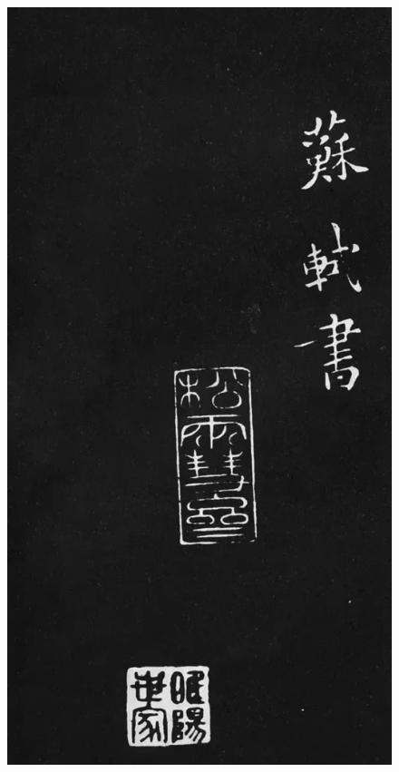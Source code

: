 \documentclass[a4paper,twoside]{article}
\begin{document}
\begin{figure}[ht]
\centering
\includegraphics[width=12.2cm]{images/sushi-7}
\end{figure}
\cleardoublepage
\end{document}
